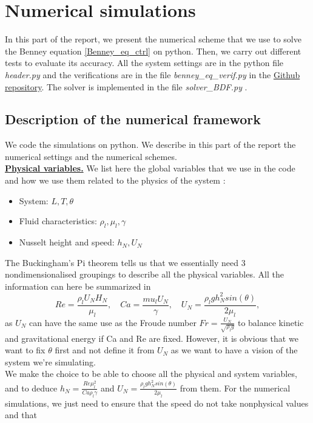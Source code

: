 \documentclass[12pt]{article}
\begin{document}
\section{Numerical simulations}\label{Section_Numerical_simu}
In this part of the report, we present the numerical scheme that we use to solve the Benney equation 
\eqref{Benney_eq_ctrl} on python. Then, we carry out different tests to evaluate its accuracy. All the system
 settings are in the python file \textit{header.py} and the verifications are in the file \textit{benney\_eq\_verif.py}
 in the \href{https://github.com/Bilal59170/Repo_Warwick_internship}{Github repository}. The solver is implemented
 in the file \textit{solver\_BDF.py} .


 \subsection{Description of the numerical framework}
We code the simulations on python. We describe in this part of the report the numerical settings and the numerical schemes.
\\

\underline{\textbf{Physical variables.}}
 We list here the global variables that we use in the code and how we use them related to the physics of the system :

\begin{itemize}
    \item System: $L,T,\theta$
    \item Fluid characteristics: $\rho_l, \mu_l, \gamma$
    \item Nusselt height and speed: $h_N, U_N$ 
\end{itemize}


The Buckingham's Pi theorem tells us that we essentially need 3 nondimensionalised groupings to describe all the
 physical variables. All the information can here be summarized
  in $$Re = \frac{\rho_l U_N H_N}{\mu_l}, \quad Ca=\frac{mu_l U_N}{\gamma}, \quad U_N=\frac{\rho_l g h_N^2 sin(\theta)}{2\mu_l},$$
   as $U_N$ can have the same use as the Froude number $Fr = \frac{U_N}{\sqrt{\rho_l g}}$ to balance kinetic and gravitational 
   energy if Ca and Re are fixed. However, it is obvious that we want to fix $\theta$ first and not define it from $U_N$ as we 
   want to have a vision of the system we're simulating. 
\\

We make the choice to be able to choose all the physical and system variables, and to deduce 
$h_N = \frac{Re \mu_l^2}{Ca\rho_l \gamma}$ and $U_N = \frac{\rho_l g h_N^2 sin(\theta)}{2\mu_l}$ from them. For the numerical simulations, 
we just need to ensure that the speed do not take nonphysical values and that 
\end{document}
